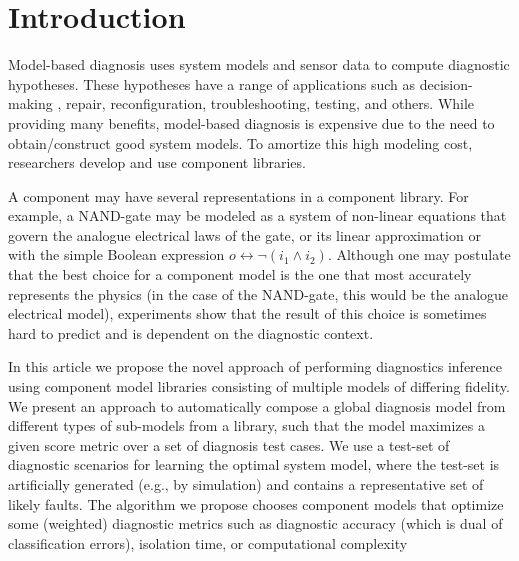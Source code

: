 \section{Introduction}
%
Model-based diagnosis \citep{dekleer87diagnosing} uses system models
and sensor data to compute diagnostic hypotheses. These hypotheses
have a range of applications such as decision-making
\citep{feldman13genius}, repair, reconfiguration, troubleshooting,
testing, and others. While providing many benefits, model-based
diagnosis is expensive due to the need to obtain/construct good system
models. To amortize this high modeling cost, researchers develop and
use component libraries.
\par
A component may have several representations in a component
library. For example, a NAND-gate may be modeled as a system of
non-linear equations that govern the analogue electrical laws of the
gate, or its linear approximation or with the simple Boolean
expression $o \leftrightarrow \neg(i_1 \wedge i_2)$. Although one may
postulate that the best choice for a component model is the one that
most accurately represents the physics (in the case of the NAND-gate,
this would be the analogue electrical model), experiments show that
the result of this choice is sometimes hard to predict and is
dependent on the diagnostic context.
\par
In this article we propose the novel approach of performing
diagnostics inference using component model
libraries consisting of multiple models of differing fidelity. 
We present an approach to automatically compose a global diagnosis model from different types of sub-models from a library, such that the  model  maximizes a given score metric over a set of diagnosis test cases.
We use a test-set of diagnostic scenarios for learning the optimal system model,
where the test-set is artificially generated (e.g., by simulation) and
contains a representative set of likely faults. The algorithm we
propose chooses component models that optimize some (weighted)
diagnostic metrics such as diagnostic accuracy (which is dual of
classification errors), isolation time, or computational complexity
